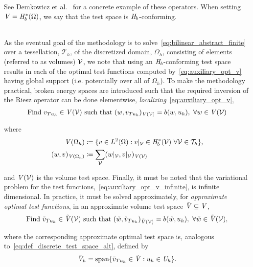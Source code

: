 See Demkowicz et al.~\cite[eq. ()]{Demkowicz2014_overview} for a concrete example of these operators.
When setting $\mathit{{{V}}} = \mathit{{{H}}}_b^*(\Omega)$, we say that the test space is $\mathit{{{H}}}_b$-conforming.
\\~

As the eventual goal of the methodology is to solve~\eqref{eq:bilinear_abstract_finite} over a tessellation,
$\mathcal{T}_h$, of the discretized domain, $\Omega_h$, consisting of elements (referred to as volumes) $\mathcal{{{V}}}$, we
note that using an $\mathit{{{H}}}_b$-conforming test space results in each of the optimal test functions computed
by~\eqref{eq:auxiliary_opt_v} having global support (i.e. potentially over all of $\Omega_h$).  To make the methodology
practical, broken energy spaces are introduced such that the required inversion of the Riesz operator can be done
elementwise, \emph{localizing}~\eqref{eq:auxiliary_opt_v},
\begin{align} \label{eq:auxiliary_opt_v_infinite}
\text{Find}\ v_{T u_h} \in \mathit{{{V}}}(\mathcal{{{V}}})\ \text{such that}\
(w,v_{T u_h})_{\mathit{{{V}}}(\mathcal{{{V}}})} = b(w,u_h),\ \forall w \in \mathit{{{V}}}(\mathcal{{{V}}})
\end{align}

where 
\begin{align}
\mathit{{{V}}}(\Omega_h) 
&\coloneqq
\{ v \in L^2(\Omega) : v|_{\mathcal{{{V}}}} \in \mathit{{{H}}}_b^*(\mathcal{{{V}}})\ \forall \mathcal{{{V}}} \in \mathcal{T}_h \}, \\
(w,v)_{\mathit{{{V}}}(\Omega_h)}
&\coloneqq
\sum_{\mathcal{{{V}}}} (w|_{\mathcal{{{V}}}},v|_{\mathcal{{{V}}}})_{\mathit{{{V}}}(\mathcal{{{V}}})}
\end{align}

and $\mathit{{{V}}}(\mathcal{{{V}}})$ is the volume test space. Finally, it must be noted that the variational problem for the test
functions,~\eqref{eq:auxiliary_opt_v_infinite}, is infinite dimensional. In practice, it must be solved approximately, for
\textit{approximate optimal test functions}, in an approximate volume test space $\tilde{\mathit{{{V}}}} \subseteq \mathit{{{V}}}$,
\begin{align} \label{eq:auxiliary_opt_v_finite}
\text{Find}\ \tilde{v}_{T u_h} \in \afspace{V}(\fe{V})\ \text{such that}\
(\tilde{w},\tilde{v}_{T u_h})_{\afspace{V}(\fe{V})} = b(\tilde{w},u_h),\ \forall \tilde{w} \in \afspace{V}(\fe{V}),
\end{align}

where the corresponding approximate optimal test space is, analogous to~\eqref{eq:def_discrete_test_space_alt}, defined by
\begin{align} \label{eq:def_discrete_test_space_alt_approx}
\tilde{\mathit{{{V}}}}_h = {\text{span} \{ \tilde{v}_{T u_h} \in \tilde{\mathit{{{V}}}} : u_h \in \mathit{{{U}}}_h \} }.
\end{align}

